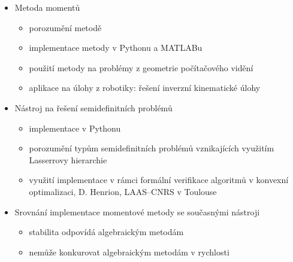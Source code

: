 \documentclass[cmpiitalkstyle, 22pt]{cmptalk}
\begin{document}
\begin{cmptalkslide}
  \begin{itemize}
    \item Metoda momentů
    \begin{itemize}
      \item porozumění metodě
      \item implementace metody v Pythonu a MATLABu
      \item použití metody na problémy z geometrie počítačového vidění
      \item aplikace na úlohy z robotiky: řešení inverzní kinematické úlohy
    \end{itemize}
    \item Nástroj na řešení semidefinitních problémů
    \begin{itemize}
      \item implementace v Pythonu
      \item porozumění typům semidefinitních problémů vznikajících využitím Lasserrovy hierarchie
      \item využití implementace v rámci formální verifikace algoritmů v konvexní optimalizaci, D. Henrion, LAAS--CNRS v Toulouse
    \end{itemize}
    \item Srovnání implementace momentové metody se současnými nástroji
    \begin{itemize}
      \item stabilita odpovídá algebraickým metodám
      \item nemůže konkurovat algebraickým metodám v rychlosti
    \end{itemize}
  \end{itemize}
\end{cmptalkslide}

\end{document}
